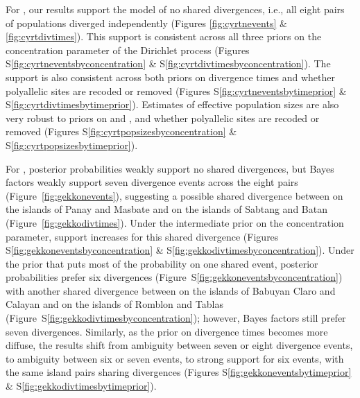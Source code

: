 
For , our \ecoevolity results support the model of no shared
divergences, i.e., all eight pairs of populations diverged independently
(Figures \ref{fig:cyrtnevents} \& \ref{fig:cyrtdivtimes}).
This support is consistent across all three priors on the concentration
parameter of the Dirichlet process
(Figures
S\ref{fig:cyrtneventsbyconcentration}
\&
S\ref{fig:cyrtdivtimesbyconcentration}).
The support is also consistent across both priors on divergence times
and whether polyallelic sites are recoded or removed
(Figures
S\ref{fig:cyrtneventsbytimeprior}
\&
S\ref{fig:cyrtdivtimesbytimeprior}).
Estimates of effective population sizes are also very robust to
priors on \concentration and \divtime, and whether polyallelic sites
are recoded or removed
(Figures
S\ref{fig:cyrtpopsizesbyconcentration}
\&
S\ref{fig:cyrtpopsizesbytimeprior}).

\ifembed{

}{}

\ifembed{

}{}

For , posterior probabilities weakly support no shared divergences,
but Bayes factors weakly support seven divergence events across the eight pairs
(Figure~\ref{fig:gekkonevents}),
suggesting a possible shared divergence between
 on the islands of Panay and Masbate
and
 on the islands of Sabtang and Batan
(Figure~\ref{fig:gekkodivtimes}).
Under the intermediate prior on the concentration parameter, support
increases for this shared divergence 
(Figures
S\ref{fig:gekkoneventsbyconcentration}
\&
S\ref{fig:gekkodivtimesbyconcentration}).
Under the prior that puts most of the probability on one shared event,
posterior probabilities prefer six divergences
(Figure~S\ref{fig:gekkoneventsbyconcentration})
with another shared divergence between
on the islands of Babuyan Claro and Calayan
and
 on the islands of Romblon and Tablas
(Figure~S\ref{fig:gekkodivtimesbyconcentration});
however, Bayes factors still prefer seven divergences.
Similarly, as the prior on divergence times becomes more diffuse,
the results shift from ambiguity between seven or eight divergence
events, to ambiguity between six or seven events, to strong
support for six events, with the same island pairs sharing
divergences
(Figures
S\ref{fig:gekkoneventsbytimeprior}
\&
S\ref{fig:gekkodivtimesbytimeprior}).

